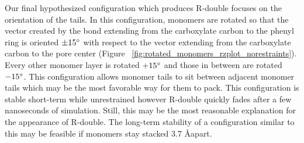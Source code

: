 \documentclass[journal=jpcbfk,manusciprt=article]{achemso}
\begin{document}
  Our final hypothesized configuration which produces R-double focuses on the orientation of the
  tails. In this configuration, monomers are rotated so that the vector created by the  
  bond extending from the carboxylate carbon to the phenyl ring is oriented $\pm 15 \degree$
  with respect to the vector extending from the carboxylate carbon to the pore	center (Figure
  ~\ref{fig:rotated_monomers_rzplot_norestraints}). Every other monomer layer is rotated $+15
  \degree$ and those in between are rotated $-15 \degree$. This configuration allows monomer
  tails to sit between adjacent monomer tails which may be the most favorable way for them to
  pack. This configuration is stable short-term while unrestrained however R-double quickly 
  fades after a few nanoseconds of simulation. Still, this may be the most reasonable
  explanation for the appearance of R-double. The long-term stability of a configuration
  similar to this may be feasible if monomers stay stacked 3.7 \AA apart. 
  
\end{document}
